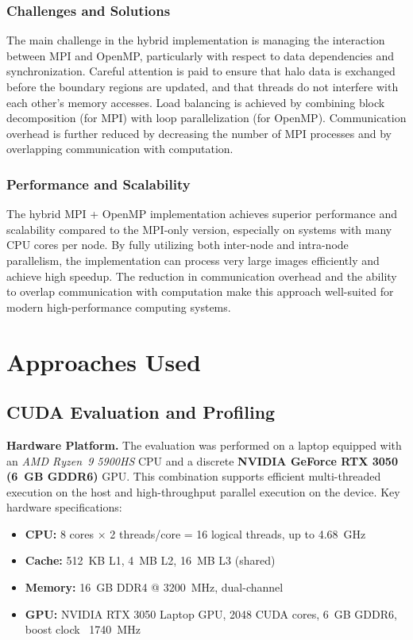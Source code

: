 \documentclass[conference, 10pt]{IEEEtran}
\begin{document}
\subsubsection{Challenges and Solutions}
The main challenge in the hybrid implementation is managing the interaction between MPI and OpenMP, particularly with respect to data dependencies and synchronization. Careful attention is paid to ensure that halo data is exchanged before the boundary regions are updated, and that threads do not interfere with each other's memory accesses. Load balancing is achieved by combining block decomposition (for MPI) with loop parallelization (for OpenMP). Communication overhead is further reduced by decreasing the number of MPI processes and by overlapping communication with computation.

\subsubsection{Performance and Scalability}
The hybrid MPI + OpenMP implementation achieves superior performance and scalability compared to the MPI-only version, especially on systems with many CPU cores per node. By fully utilizing both inter-node and intra-node parallelism, the implementation can process very large images efficiently and achieve high speedup. The reduction in communication overhead and the ability to overlap communication with computation make this approach well-suited for modern high-performance computing systems.






\section{Approaches Used}

\subsection{\textbf{CUDA Evaluation and Profiling}}

\textbf{Hardware Platform.} 
The evaluation was performed on a laptop equipped with an \textit{AMD Ryzen\texttrademark~9 5900HS} CPU and a discrete \textbf{NVIDIA GeForce RTX 3050 (6~GB GDDR6)} GPU. This combination supports efficient multi-threaded execution on the host and high-throughput parallel execution on the device. Key hardware specifications:

\begin{itemize}
    \item \textbf{CPU:} 8 cores $\times$ 2 threads/core = 16 logical threads, up to 4.68~GHz
    \item \textbf{Cache:} 512~KB L1, 4~MB L2, 16~MB L3 (shared)
    \item \textbf{Memory:} 16~GB DDR4 @ 3200~MHz, dual-channel
    \item \textbf{GPU:} NVIDIA RTX 3050 Laptop GPU, 2048 CUDA cores, 6~GB GDDR6, boost clock ~1740~MHz
\end{itemize}
\end{document}
